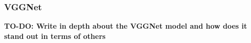 \subsubsection{VGGNet}
\textbf{TO-DO: Write in depth about the VGGNet model and how does it stand out in terms of others}